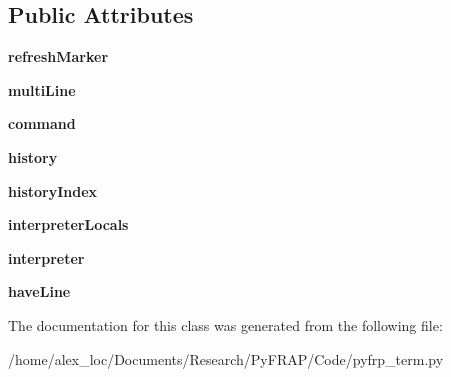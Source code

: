 \subsection*{Public Attributes}
\begin{DoxyCompactItemize}
\item 
\hypertarget{classpyfrp__term_1_1PyInterp_a4555438064452a14b36bc5cd542e8e73}{{\bfseries refresh\+Marker}}\label{classpyfrp__term_1_1PyInterp_a4555438064452a14b36bc5cd542e8e73}

\item 
\hypertarget{classpyfrp__term_1_1PyInterp_a18b88274cf6ec0fb9cddc523b6a7fadc}{{\bfseries multi\+Line}}\label{classpyfrp__term_1_1PyInterp_a18b88274cf6ec0fb9cddc523b6a7fadc}

\item 
\hypertarget{classpyfrp__term_1_1PyInterp_a22170ccbb30954cb73199ee147fb2673}{{\bfseries command}}\label{classpyfrp__term_1_1PyInterp_a22170ccbb30954cb73199ee147fb2673}

\item 
\hypertarget{classpyfrp__term_1_1PyInterp_ab3ab46aaa354b0e04c0a396580c72ae4}{{\bfseries history}}\label{classpyfrp__term_1_1PyInterp_ab3ab46aaa354b0e04c0a396580c72ae4}

\item 
\hypertarget{classpyfrp__term_1_1PyInterp_a831e22d99070fbd46e6330e81c7d80c5}{{\bfseries history\+Index}}\label{classpyfrp__term_1_1PyInterp_a831e22d99070fbd46e6330e81c7d80c5}

\item 
\hypertarget{classpyfrp__term_1_1PyInterp_aee07684435a3b88b5fc3ffcd92a3341d}{{\bfseries interpreter\+Locals}}\label{classpyfrp__term_1_1PyInterp_aee07684435a3b88b5fc3ffcd92a3341d}

\item 
\hypertarget{classpyfrp__term_1_1PyInterp_a18bfb5fdefd63b707e18da89b7d64aaa}{{\bfseries interpreter}}\label{classpyfrp__term_1_1PyInterp_a18bfb5fdefd63b707e18da89b7d64aaa}

\item 
\hypertarget{classpyfrp__term_1_1PyInterp_a973aea883afc98f82001af8cfd105804}{{\bfseries have\+Line}}\label{classpyfrp__term_1_1PyInterp_a973aea883afc98f82001af8cfd105804}

\end{DoxyCompactItemize}


The documentation for this class was generated from the following file\+:\begin{DoxyCompactItemize}
\item 
/home/alex\+\_\+loc/\+Documents/\+Research/\+Py\+F\+R\+A\+P/\+Code/pyfrp\+\_\+term.\+py\end{DoxyCompactItemize}
